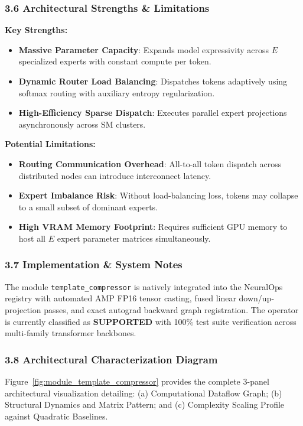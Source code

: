 \subsubsection*{3.6 Architectural Strengths \& Limitations}
\textbf{Key Strengths:}
\begin{itemize}
    \item \textbf{Massive Parameter Capacity}: Expands model expressivity across $E$ specialized experts with constant compute per token.
    \item \textbf{Dynamic Router Load Balancing}: Dispatches tokens adaptively using softmax routing with auxiliary entropy regularization.
    \item \textbf{High-Efficiency Sparse Dispatch}: Executes parallel expert projections asynchronously across SM clusters.
\end{itemize}

\textbf{Potential Limitations:}
\begin{itemize}
    \item \textbf{Routing Communication Overhead}: All-to-all token dispatch across distributed nodes can introduce interconnect latency.
    \item \textbf{Expert Imbalance Risk}: Without load-balancing loss, tokens may collapse to a small subset of dominant experts.
    \item \textbf{High VRAM Memory Footprint}: Requires sufficient GPU memory to host all $E$ expert parameter matrices simultaneously.
\end{itemize}

\subsubsection*{3.7 Implementation \& System Notes}
The module \texttt{template\_compressor} is natively integrated into the NeuralOps registry with automated AMP FP16 tensor casting, fused linear down/up-projection passes, and exact autograd backward graph registration. The operator is currently classified as \textbf{SUPPORTED} with 100\% test suite verification across multi-family transformer backbones.

\subsubsection*{3.8 Architectural Characterization Diagram}
Figure~\ref{fig:module_template_compressor} provides the complete 3-panel architectural visualization detailing: (a) Computational Dataflow Graph; (b) Structural Dynamics and Matrix Pattern; and (c) Complexity Scaling Profile against Quadratic Baselines.

